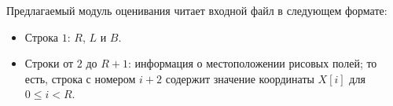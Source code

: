 Предлагаемый модуль оценивания читает входной файл в следующем формате:

\begin{itemize}
\item Строка $1$: $R$, $L$ и $B$.
\item Строки от $2$ до $R+1$: информация о местоположении рисовых полей; то есть, строка с номером $i+2$ содержит значение координаты $X[i]$ для $0 \le i < R$.
\end{itemize}

